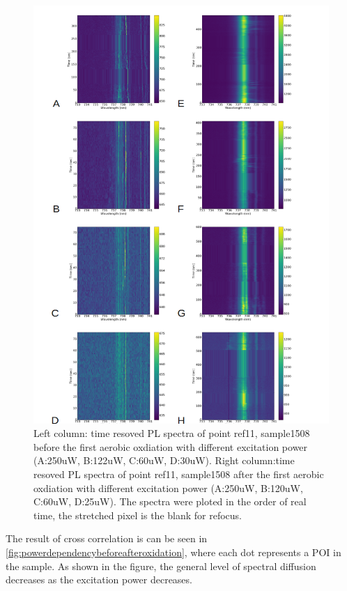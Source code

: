 \begin{figure}[h]
	\centering
	\includegraphics[width=1\linewidth]{Figures/pic/powerdependenceref11}
	\caption{Left column: time resoved PL spectra of point ref11, sample1508 before the first aerobic oxdiation with different excitation power (A:250uW, B:122uW, C:60uW, D:30uW). Right column:time resoved PL spectra of point ref11, sample1508 after the first aerobic oxdiation with different excitation power (A:250uW, B:120uW, C:60uW, D:25uW). The spectra were ploted in the order of real time, the stretched pixel is the blank for refocus.}
	\label{fig:powerdependenceref11}
\end{figure}

The result of cross correlation is can be seen in \ref{fig:powerdependencybeforeafteroxidation}, where each dot represents a POI in the sample. As shown in the figure, the general level of spectral diffusion decreases as the excitation power decreases. 

